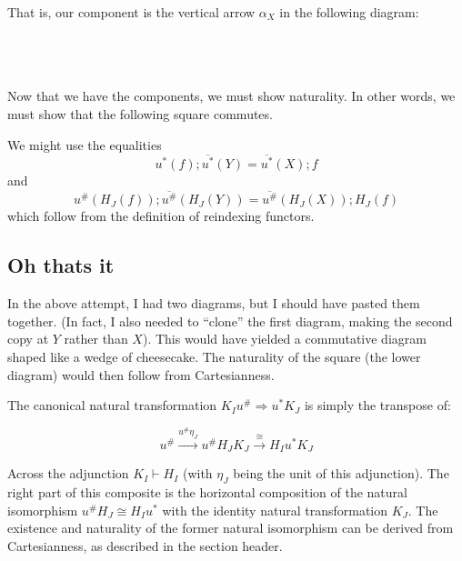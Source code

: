 \documentclass{article}
\begin{document}
That is, our component is the vertical arrow $\alpha_X$ in the following diagram:\\~\\
~\\~\\

Now that we have the components, we must show naturality. In other words, we must show that the following square commutes.


We might use the equalities $$u^*(f);\overline{u^*}(Y) = \overline{u^*}(X);f$$ and 
$$u^{\#}(H_J(f));\overline{u^{\#}}(H_J(Y)) = \overline{u^{\#}}(H_J(X));H_J(f)$$
which follow from the definition of reindexing functors.


\subsection*{Oh thats it}

In the above attempt, I had two diagrams, but I should have pasted them together. 
(In fact, I also needed to ``clone'' the first diagram, making the second copy at $Y$ rather than $X$). 
This would have yielded a commutative 
diagram shaped like a wedge of cheesecake. The naturality of the square (the lower diagram) would then follow
from Cartesianness.

The canonical natural transformation $K_I u^{\#} \Rightarrow u^* K_J$ is simply the transpose of:

$$u^{\#} \overset{u^{\#}\eta_J}{\longrightarrow} u^{\#} H_J K_J \overset{\cong}{\longrightarrow} H_I u^* K_J $$

Across the adjunction $K_I \vdash H_I$ (with $\eta_J$ being the unit of this adjunction). 
The right part of this composite is the horizontal composition of the natural isomorphism $u^{\#}H_J \cong H_I u^*$ with
the identity natural transformation $K_J$. The existence and
naturality of the former natural isomorphism can be derived from Cartesianness, as described in the section header.
\end{document}
